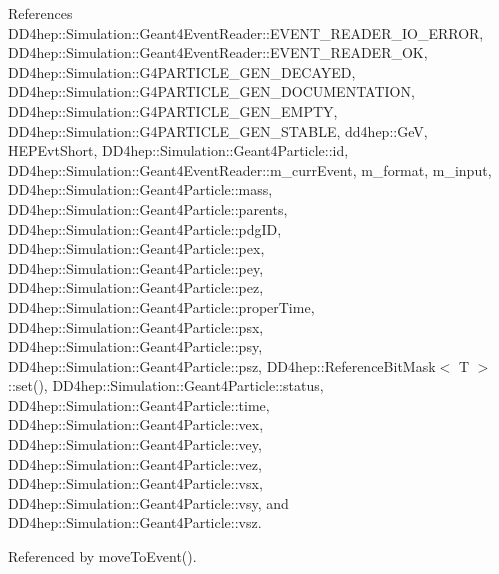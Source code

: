 References D\+D4hep\+::\+Simulation\+::\+Geant4\+Event\+Reader\+::\+E\+V\+E\+N\+T\+\_\+\+R\+E\+A\+D\+E\+R\+\_\+\+I\+O\+\_\+\+E\+R\+R\+OR, D\+D4hep\+::\+Simulation\+::\+Geant4\+Event\+Reader\+::\+E\+V\+E\+N\+T\+\_\+\+R\+E\+A\+D\+E\+R\+\_\+\+OK, D\+D4hep\+::\+Simulation\+::\+G4\+P\+A\+R\+T\+I\+C\+L\+E\+\_\+\+G\+E\+N\+\_\+\+D\+E\+C\+A\+Y\+ED, D\+D4hep\+::\+Simulation\+::\+G4\+P\+A\+R\+T\+I\+C\+L\+E\+\_\+\+G\+E\+N\+\_\+\+D\+O\+C\+U\+M\+E\+N\+T\+A\+T\+I\+ON, D\+D4hep\+::\+Simulation\+::\+G4\+P\+A\+R\+T\+I\+C\+L\+E\+\_\+\+G\+E\+N\+\_\+\+E\+M\+P\+TY, D\+D4hep\+::\+Simulation\+::\+G4\+P\+A\+R\+T\+I\+C\+L\+E\+\_\+\+G\+E\+N\+\_\+\+S\+T\+A\+B\+LE, dd4hep\+::\+GeV, H\+E\+P\+Evt\+Short, D\+D4hep\+::\+Simulation\+::\+Geant4\+Particle\+::id, D\+D4hep\+::\+Simulation\+::\+Geant4\+Event\+Reader\+::m\+\_\+curr\+Event, m\+\_\+format, m\+\_\+input, D\+D4hep\+::\+Simulation\+::\+Geant4\+Particle\+::mass, D\+D4hep\+::\+Simulation\+::\+Geant4\+Particle\+::parents, D\+D4hep\+::\+Simulation\+::\+Geant4\+Particle\+::pdg\+ID, D\+D4hep\+::\+Simulation\+::\+Geant4\+Particle\+::pex, D\+D4hep\+::\+Simulation\+::\+Geant4\+Particle\+::pey, D\+D4hep\+::\+Simulation\+::\+Geant4\+Particle\+::pez, D\+D4hep\+::\+Simulation\+::\+Geant4\+Particle\+::proper\+Time, D\+D4hep\+::\+Simulation\+::\+Geant4\+Particle\+::psx, D\+D4hep\+::\+Simulation\+::\+Geant4\+Particle\+::psy, D\+D4hep\+::\+Simulation\+::\+Geant4\+Particle\+::psz, D\+D4hep\+::\+Reference\+Bit\+Mask$<$ T $>$\+::set(), D\+D4hep\+::\+Simulation\+::\+Geant4\+Particle\+::status, D\+D4hep\+::\+Simulation\+::\+Geant4\+Particle\+::time, D\+D4hep\+::\+Simulation\+::\+Geant4\+Particle\+::vex, D\+D4hep\+::\+Simulation\+::\+Geant4\+Particle\+::vey, D\+D4hep\+::\+Simulation\+::\+Geant4\+Particle\+::vez, D\+D4hep\+::\+Simulation\+::\+Geant4\+Particle\+::vsx, D\+D4hep\+::\+Simulation\+::\+Geant4\+Particle\+::vsy, and D\+D4hep\+::\+Simulation\+::\+Geant4\+Particle\+::vsz.



Referenced by move\+To\+Event().

\hypertarget{class_d_d4hep_1_1_simulation_1_1_geant4_event_reader_hep_evt_a643c4f3e44964b0a5692b5b169ada9e6}{}\label{class_d_d4hep_1_1_simulation_1_1_geant4_event_reader_hep_evt_a643c4f3e44964b0a5692b5b169ada9e6} 
